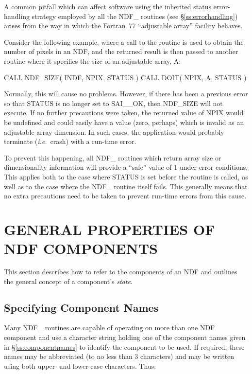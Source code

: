 \documentclass[twoside,11pt,nolof]{starlink}
\providecommand{\st}[1]{{\emph{#1}}}
\begin{document}
A common pitfall which can affect software using the inherited status
error-handling strategy employed by all the NDF\_ routines (see
\S\ref{ss:errorhandling}) arises from the way in which the Fortran~77
``adjustable array'' facility behaves.

Consider the following example, where a call to the  routine is
used to obtain the number of pixels in an NDF, and the returned result is
then passed to another routine where it specifies the size of an adjustable
array, A:

\small
\begin{terminalv}
      CALL NDF_SIZE( INDF, NPIX, STATUS )
      CALL DOIT( NPIX, A, STATUS )
\end{terminalv}
\normalsize

Normally, this will cause no problems.
However, if there has been a previous error so that STATUS is no longer set
to SAI\_\_OK, then NDF\_SIZE will not execute.
If no further precautions were taken, the returned value of NPIX would be
undefined and could easily have a value (zero, perhaps) which is invalid as
an adjustable array dimension.
In such cases, the application would probably terminate (\st{i.e.}\ crash)
with a run-time error.

To prevent this happening, all NDF\_ routines which return array size or
dimensionality information will provide a ``safe'' value of 1 under error
conditions.
This applies both to the case where STATUS is set before the routine is
called, as well as to the case where the NDF\_ routine itself fails.
This generally means that no extra precautions need to be taken to prevent
run-time errors from this cause.


\section{GENERAL PROPERTIES OF NDF COMPONENTS}

This section describes how to refer to the components of an NDF and outlines
the general concept of a component's \st{state}.

\subsection{\label{ss:componentnamespec}Specifying Component Names}

Many NDF\_ routines are capable of operating on more than one NDF component
and use a character string holding one of the component names given in
\S\ref{ss:componentnames} to identify the component to be used.
If required, these names may be abbreviated (to no less than 3  characters) and
may be written using both upper- and lower-case characters.
Thus:
\end{document}
